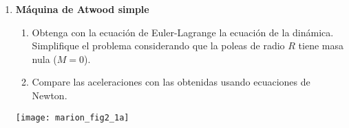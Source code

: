 \documentclass[11pt,spanish,a4paper]{article}
\begin{document}
\begin{enumerate}
%


\item \textbf{Máquina de Atwood simple}\\
\begin{minipage}[t][5.3cm]{0.6\textwidth}
\begin{enumerate}
	\item Obtenga con la ecuación de Euler-Lagrange la ecuación de la dinámica.
	Simplifique el problema considerando que la poleas de radio \(R\) tiene masa nula (\(M=0\)).
	\item Compare las aceleraciones con las obtenidas usando ecuaciones de Newton.
\end{enumerate}
\end{minipage}
\begin{minipage}[c][2em][t]{0.4\textwidth}
	\hspace{0.5cm}
	\texttt{[image: marion\_fig2\_1a]}
\end{minipage}




\end{enumerate}
\end{document}
